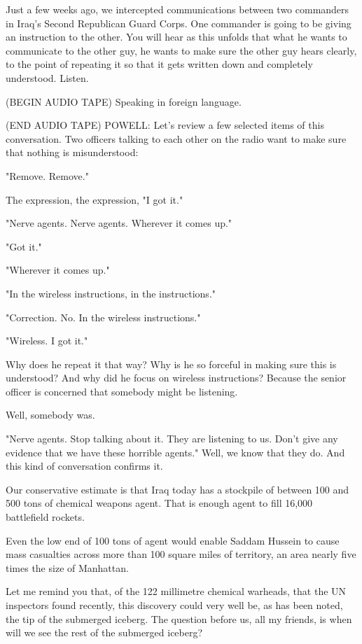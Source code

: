 \documentclass[10pt,a4paper]{article}
\begin{document}
Just a few weeks ago, we intercepted communications between two commanders in Iraq's Second Republican Guard Corps. One commander is going to be giving an instruction to the other. You will hear as this unfolds that what he wants to communicate to the other guy, he wants to make sure the other guy hears clearly, to the point of repeating it so that it gets written down and completely understood. Listen.

(BEGIN AUDIO TAPE) Speaking in foreign language.

(END AUDIO TAPE) POWELL: Let's review a few selected items of this conversation. Two officers talking to each other on the radio want to make sure that nothing is misunderstood:

"Remove. Remove."

The expression, the expression, "I got it."

"Nerve agents. Nerve agents. Wherever it comes up."

"Got it."

"Wherever it comes up."

"In the wireless instructions, in the instructions."

"Correction. No. In the wireless instructions."

"Wireless. I got it."

Why does he repeat it that way? Why is he so forceful in making sure this is understood? And why did he focus on wireless instructions? Because the senior officer is concerned that somebody might be listening.

Well, somebody was.

"Nerve agents. Stop talking about it. They are listening to us. Don't give any evidence that we have these horrible agents." Well, we know that they do. And this kind of conversation confirms it.

Our conservative estimate is that Iraq today has a stockpile of between 100 and 500 tons of chemical weapons agent. That is enough agent to fill 16,000 battlefield rockets.

Even the low end of 100 tons of agent would enable Saddam Hussein to cause mass casualties across more than 100 square miles of territory, an area nearly five times the size of Manhattan.

Let me remind you that, of the 122 millimetre chemical warheads, that the UN inspectors found recently, this discovery could very well be, as has been noted, the tip of the submerged iceberg. The question before us, all my friends, is when will we see the rest of the submerged iceberg?
\end{document}
